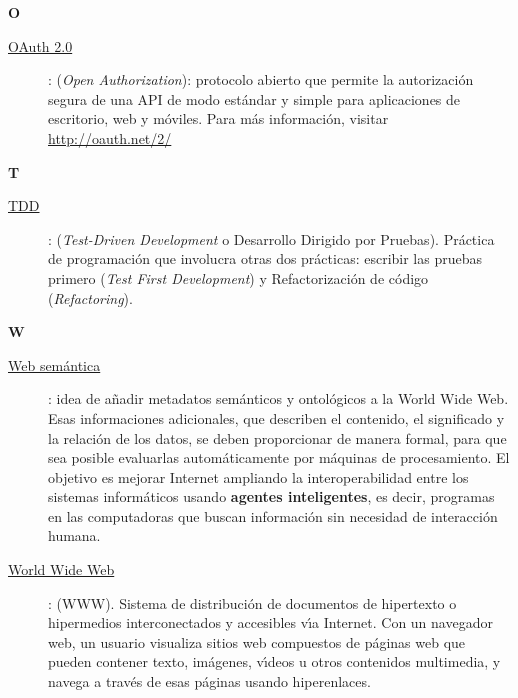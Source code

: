 \bigskip
{\bfseries {\Huge O}}\label{Apendice1:O}
\bigskip
\bigskip

\begin{description}
  \item[\underline{OAuth 2.0}\label{apend1:oauth}]: (\textit{Open Authorization}): protocolo abierto que permite la autorizaci\'on segura de una API de modo est\'andar y simple para 
  aplicaciones de escritorio, web y m\'oviles. Para m\'as informaci\'on, visitar {\small \url{http://oauth.net/2/}}
  \bigskip
\end{description}
\newpage


{\bfseries {\Huge T}}\label{Apendice1:T}
\bigskip
\bigskip

\begin{description}
  \item[\underline{TDD}\label{apend1:tdd}]: (\textit{Test-Driven Development} o Desarrollo Dirigido por Pruebas). Pr\'actica de programaci\'on que involucra otras dos pr\'acticas: escribir las 
  pruebas primero (\textit{Test First Development}) y Refactorizaci\'on de c\'odigo (\textit{Refactoring}).
  \bigskip
\end{description}

\bigskip
{\bfseries {\Huge W}}\label{Apendice1:W}
\bigskip
\bigskip

\begin{description}
  \item[\underline{Web sem\'antica}\label{apend1:web}]: idea de a\~{n}adir metadatos sem\'anticos y ontol\'ogicos a la World Wide Web. Esas informaciones adicionales, que describen el contenido, 
  el significado y la relaci\'on de los datos, se deben proporcionar de manera formal, para que sea posible evaluarlas autom\'aticamente por m\'aquinas de procesamiento. El objetivo es mejorar 
  Internet ampliando la interoperabilidad entre los sistemas inform\'aticos usando {\bfseries agentes inteligentes}, es decir, programas en las computadoras que buscan informaci\'on sin necesidad de 
  interacci\'on humana.
  \bigskip
\end{description}

\begin{description}
  \item[\underline{World Wide Web}\label{apend1:www}]: (WWW). Sistema de distribuci\'on de documentos de hipertexto o hipermedios interconectados y accesibles v\'{\i}a Internet. Con un navegador 
  web, un usuario visualiza sitios web compuestos de p\'aginas web que pueden contener texto, im\'agenes, v\'{\i}deos u otros contenidos multimedia, y navega a trav\'es de esas p\'aginas usando 
hiperenlaces.
  \bigskip
\end{description}